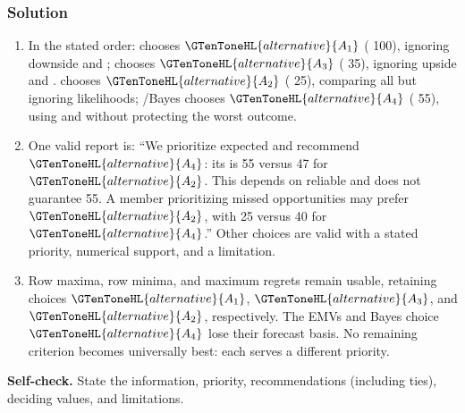 \subsubsection*{Solution}
\begin{enumerate}
\item In the stated order:  chooses $\GTenToneHL{alternative}{A_1}$ (  100), ignoring downside and ;  chooses $\GTenToneHL{alternative}{A_3}$ (  35), ignoring upside and .   chooses $\GTenToneHL{alternative}{A_2}$ (  25), comparing all  but ignoring likelihoods; /Bayes chooses $\GTenToneHL{alternative}{A_4}$ ( 55), using  and  without protecting the worst outcome.
\item One valid report is: ``We prioritize expected  and recommend $\GTenToneHL{alternative}{A_4}$: its  is 55 versus 47 for $\GTenToneHL{alternative}{A_2}$. This depends on reliable  and does not guarantee 55. A member prioritizing missed opportunities may prefer $\GTenToneHL{alternative}{A_2}$, with   25 versus 40 for $\GTenToneHL{alternative}{A_4}$.'' Other choices are valid with a stated priority, numerical support, and a limitation.
\item Row maxima, row minima, and maximum regrets remain usable, retaining choices $\GTenToneHL{alternative}{A_1}$, $\GTenToneHL{alternative}{A_3}$, and $\GTenToneHL{alternative}{A_2}$, respectively. The EMVs and Bayes choice $\GTenToneHL{alternative}{A_4}$ lose their forecast basis. No remaining criterion becomes universally best: each serves a different priority.
\end{enumerate}
\textbf{Self-check.} State the information, priority, recommendations (including ties), deciding values, and limitations.

